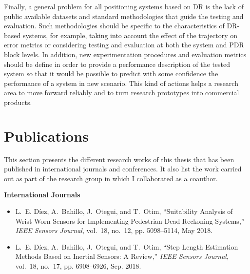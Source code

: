 Finally, a general problem for all positioning systems based on DR is the lack of public available datasets and standard methodologies that guide the testing and evaluation.
Such methodologies should be specific to the characteristics of DR-based systems, for example, taking into account the effect of the trajectory on error metrics or considering testing and evaluation at both the system and PDR block levels.
In addition, new experimentation procedures and evaluation metrics should be define in order to provide a performance description of the tested system so that it would be possible to predict with some confidence the performance of a system in new scenario.
This kind of actions helps a research area to move forward reliably and to turn research prototypes into commercial products.
\section{Publications}
\label{sec:10_3_publication}
This section presents the different research works of this thesis that has been published in international journals and conferences. 
It also list the work carried out as part of the research group in which I collaborated as a coauthor.

\textbf{International Journals}
\begin{itemize}
	\item L.~E. Díez, A.~Bahillo, J.~Otegui, and T.~Otim, ``Suitability {Analysis} of {Wrist}-{Worn} {Sensors} for {Implementing} {Pedestrian} {Dead} {Reckoning} {Systems},'' \emph{IEEE Sensors Journal}, vol.~18, no.~12, pp. 5098--5114, May 2018.
	\item L.~E. Díez, A.~Bahillo, J.~Otegui, and T.~Otim, ``Step {Length} {Estimation} {Methods} {Based} on {Inertial} {Sensors}: {A} {Review},'' \emph{IEEE Sensors Journal}, vol.~18, no.~17, pp. 6908--6926, Sep. 2018.	
\end{itemize}	


